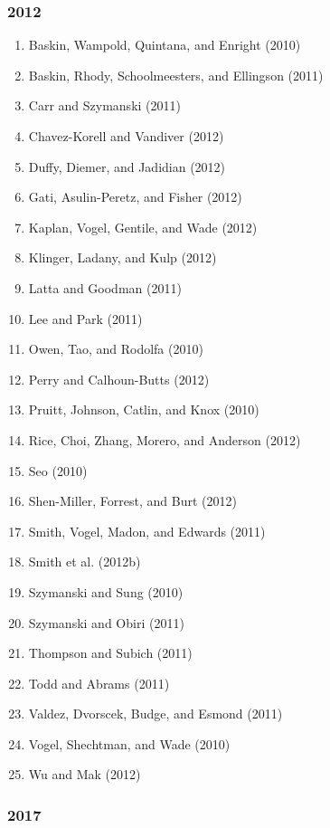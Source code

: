 \documentclass[english,man]{apa6}
\providecommand{\tightlist}{%
  \setlength{\itemsep}{0pt}\setlength{\parskip}{0pt}}
\begin{document}
\subsubsection{2012}\label{section-10}

\begin{enumerate}
\def\labelenumi{\arabic{enumi})}
\tightlist
\item
  Baskin, Wampold, Quintana, and Enright (2010)
\item
  Baskin, Rhody, Schoolmeesters, and Ellingson (2011)
\item
  Carr and Szymanski (2011)
\item
  Chavez-Korell and Vandiver (2012)
\item
  Duffy, Diemer, and Jadidian (2012)
\item
  Gati, Asulin-Peretz, and Fisher (2012)
\item
  Kaplan, Vogel, Gentile, and Wade (2012)
\item
  Klinger, Ladany, and Kulp (2012)
\item
  Latta and Goodman (2011)
\item
  Lee and Park (2011)
\item
  Owen, Tao, and Rodolfa (2010)
\item
  Perry and Calhoun-Butts (2012)
\item
  Pruitt, Johnson, Catlin, and Knox (2010)
\item
  Rice, Choi, Zhang, Morero, and Anderson (2012)
\item
  Seo (2010)
\item
  Shen-Miller, Forrest, and Burt (2012)
\item
  Smith, Vogel, Madon, and Edwards (2011)
\item
  Smith et al. (2012b)
\item
  Szymanski and Sung (2010)
\item
  Szymanski and Obiri (2011)
\item
  Thompson and Subich (2011)
\item
  Todd and Abrams (2011)
\item
  Valdez, Dvorscek, Budge, and Esmond (2011)
\item
  Vogel, Shechtman, and Wade (2010)
\item
  Wu and Mak (2012)
\end{enumerate}

\subsubsection{2017}\label{section-11}
\end{document}
